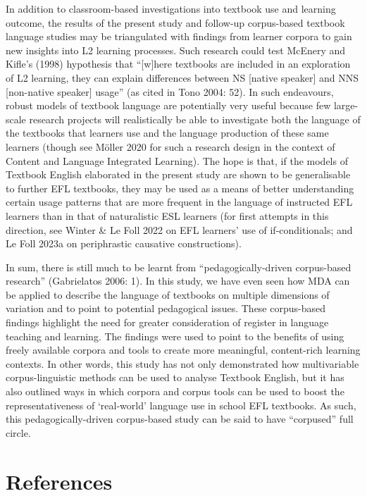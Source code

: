 \documentclass[
  letterpaper,
  DIV=11,
  numbers=noendperiod]{scrreprt}
\begin{document}
In addition to classroom-based investigations into textbook use and
learning outcome, the results of the present study and follow-up
corpus-based textbook language studies may be triangulated with findings
from learner corpora to gain new insights into L2 learning processes.
Such research could test McEnery and Kifle's (1998) hypothesis that
``{[}w{]}here textbooks are included in an exploration of L2 learning,
they can explain differences between NS {[}native speaker{]} and NNS
{[}non-native speaker{]} usage'' (as cited in Tono 2004: 52). In such
endeavours, robust models of textbook language are potentially very
useful because few large-scale research projects will realistically be
able to investigate both the language of the textbooks that learners use
and the language production of these same learners (though see Möller
2020 for such a research design in the context of Content and Language
Integrated Learning). The hope is that, if the models of Textbook
English elaborated in the present study are shown to be generalisable to
further EFL textbooks, they may be used as a means of better
understanding certain usage patterns that are more frequent in the
language of instructed EFL learners than in that of naturalistic ESL
learners (for first attempts in this direction, see Winter \& Le Foll
2022 on EFL learners' use of if-conditionals; and Le Foll 2023a on
periphrastic causative constructions).

In sum, there is still much to be learnt from ``pedagogically-driven
corpus-based research'' (Gabrielatos 2006: 1). In this study, we have
even seen how MDA can be applied to describe the language of textbooks
on multiple dimensions of variation and to point to potential
pedagogical issues. These corpus-based findings highlight the need for
greater consideration of register in language teaching and learning. The
findings were used to point to the benefits of using freely available
corpora and tools to create more meaningful, content-rich learning
contexts. In other words, this study has not only demonstrated how
multivariable corpus-linguistic methods can be used to analyse Textbook
English, but it has also outlined ways in which corpora and corpus tools
can be used to boost the representativeness of `real-world' language use
in school EFL textbooks. As such, this pedagogically-driven corpus-based
study can be said to have ``corpused'' full circle.


\chapter*{References}\label{references}
\end{document}
